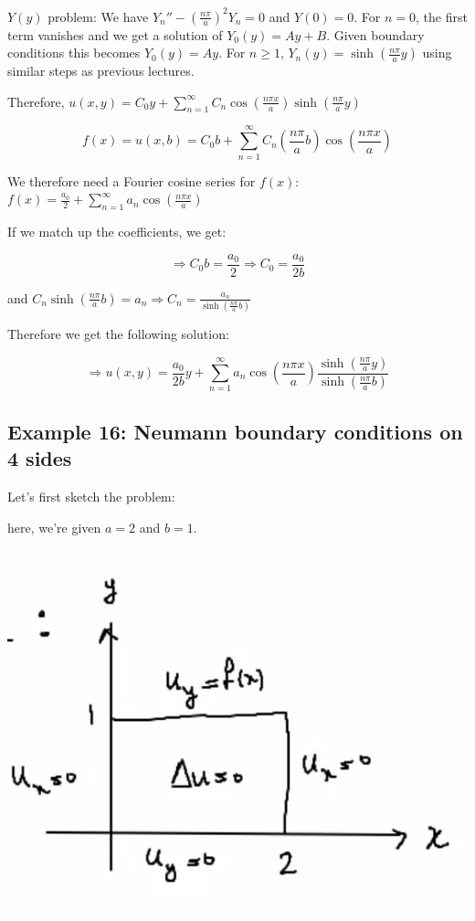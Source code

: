 \documentclass{article}
\begin{document}
$Y(y)$ problem: We have $Y_n'' - \left( \frac{n \pi}{a} \right)^2 Y_n = 0$ and $Y(0) = 0$. For $n = 0$, the first term vanishes and we get a solution of $Y_0(y) = Ay + B$. Given boundary conditions this becomes $Y_0(y) = A y$. For $n \geq 1$, $Y_n (y) = \sinh \left( \frac{n \pi}{a} y \right)$ using similar steps as previous lectures. 

Therefore, $u(x,y) = C_0 y + \sum_{n=1}^\infty C_n \cos \left(\frac{ n \pi x}{a} \right) \sinh \left( \frac{n \pi}{a} y \right)$

$$f(x) = u(x,b) = C_0 b + \sum_{n=1}^\infty C_n \left( \frac{n \pi}{a} b \right) \cos \left( \frac{n \pi x}{a} \right)$$

We therefore need a Fourier cosine series for $f(x)$: $f(x) = \frac{a_0}{2} + \sum_{n=1}^\infty a_n \cos \left( \frac{n \pi x}{a} \right)$

If we match up the coefficients, we get:

$$\Rightarrow C_0 b = \frac{a_0}{2} \Rightarrow C_0 = \frac{a_0}{2b}$$

and $C_n \sinh \left( \frac{n \pi}{a} b \right) = a_n \Rightarrow C_n = \frac{a_n}{\sinh \left( \frac{n \pi}{a} b \right)}$

Therefore we get the following solution:

$$\Rightarrow u(x,y) = \frac{a_0}{2b} y + \sum_{n=1}^\infty a_n \cos \left( \frac{n \pi x}{a} \right) \frac{ \sinh \left( \frac{n \pi}{a} y \right)}{\sinh \left( \frac{n \pi}{a} b \right)}$$

\subsection{Example 16: Neumann boundary conditions on 4 sides}

Let's first sketch the problem:

here, we're given $a = 2$ and $b = 1$. 

\begin{center}
    \includegraphics[width = 0.6 \textwidth]{3.png}
\end{center}
\end{document}
